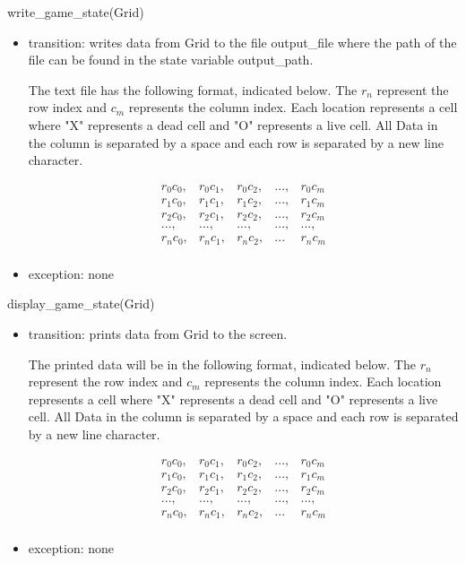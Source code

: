 \documentclass[12pt]{article}
\begin{document}
\noindent write\_game\_state(Grid)
\begin{itemize}
\item transition: writes data from Grid to the file output\_file where the path of the file can be found in the state variable output\_path.

  The text file has the following format, indicated below. The $r_n$ represent the row index and $c_m$ represents the column index. Each location represents a cell where "X" represents a dead cell and "O" represents a live cell. All Data in the column is separated by a space and each row is separated by a new line character.
  

  \begin{equation}
    \begin{array}{ccccccc}
      r_0c_0, & r_0c_1, & r_0c_2, & ..., & r_0c_m \\
      r_1c_0, & r_1c_1, & r_1c_2, & ..., & r_1c_m \\
      r_2c_0, & r_2c_1, & r_2c_2, & ..., & r_2c_m \\
       ...,   & ...,    & ...,    & ..., & ...,  \\
      r_nc_0, & r_nc_1, & r_nc_2, & ...  & r_nc_m \\

    \end{array}
  \end{equation}

\item exception: none
\end{itemize}

\noindent display\_game\_state(Grid)
\begin{itemize}
\item transition: prints data from Grid to the screen.

  The printed data will be in the following format, indicated below. The $r_n$ represent the row index and $c_m$ represents the column index. Each location represents a cell where "X" represents a dead cell and "O" represents a live cell. All Data in the column is separated by a space and each row is separated by a new line character.
  

  \begin{equation}
    \begin{array}{ccccccc}
      r_0c_0, & r_0c_1, & r_0c_2, & ..., & r_0c_m \\
      r_1c_0, & r_1c_1, & r_1c_2, & ..., & r_1c_m \\
      r_2c_0, & r_2c_1, & r_2c_2, & ..., & r_2c_m \\
       ...,   & ...,    & ...,    & ..., & ...,  \\
      r_nc_0, & r_nc_1, & r_nc_2, & ...  & r_nc_m \\

    \end{array}
  \end{equation}

\item exception: none
\end{itemize}
\end{document}

